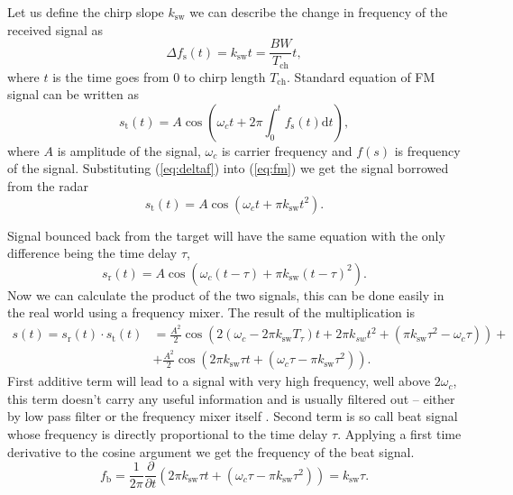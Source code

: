 Let us define the chirp slope $k_\mathrm{sw}$ we can describe the change in frequency of the received signal as
\begin{equation}
  \Delta f_\mathrm{s}(t) = k_\mathrm{sw}t = \frac{BW}{T_\mathrm{ch}} t,
  \label{eq:deltaf}
\end{equation}
where $t$ is the time goes from 0 to chirp length $T_\mathrm{ch}$.
Standard equation of FM signal can be written as
\begin{equation}
  s_\mathrm{t}(t) = A \cos\left(\omega_c t + 2\pi \int_{0}^{t} f_\mathrm{s}(t) \mathrm{d}t\right),
  \label{eq:fm}
\end{equation}
where $A$ is amplitude of the signal, $\omega_c$ is carrier frequency and $f(s)$ is frequency of the signal.
Substituting (\ref{eq:deltaf}) into (\ref{eq:fm}) we get the signal borrowed from the radar
\begin{equation}
  s_\mathrm{t}(t) = A \cos(\omega_c t + \pi k_\mathrm{sw}t^2).
  \label{eq:fm2}
\end{equation}

Signal bounced back from the target will have the same equation with the only difference being the time delay $\tau$,
\begin{equation}
  s_\mathrm{r}(t) = A \cos(\omega_c (t - \tau) + \pi k_\mathrm{sw}(t - \tau)^2).
  \label{eq:fm3}
\end{equation}
Now we can calculate the product of the two signals, this can be done easily in the real world using a frequency mixer.
The result of the multiplication is
\begin{align}
  s(t) = s_\mathrm{r}(t) \cdot  s_\mathrm{t}(t) & = \frac{A^2}{2}\cos\left(2(\omega_c - 2\pi k_\mathrm{sw}T_\tau)t + 2\pi k_{sw}t^2 + (\pi k_\mathrm{sw} \tau^2 - \omega_c \tau) \right)+ \nonumber \\
                                                & +\frac{A^2}{2} \cos\left(2\pi k_\mathrm{sw} \tau t + (\omega_c \tau - \pi k_\mathrm{sw} \tau^2)\right).
  \label{eq:fm4}
\end{align}
First additive term will lead to a signal with very high frequency, well above $2\omega_c$, this term doesn't carry any useful information and is usually filtered out -- either by low pass filter or the frequency mixer itself \cite{graham2005}.
Second term is so call beat signal whose frequency is directly proportional to the time delay $\tau$.
Applying a first time derivative to the cosine argument we get the frequency of the beat signal.
\begin{equation}
  f_\mathrm{b} = \frac{1}{2\pi}\frac{\partial}{\partial t} \left(2\pi k_\mathrm{sw} \tau t + (\omega_c \tau - \pi k_\mathrm{sw} \tau^2)\right) = k_\mathrm{sw} \tau.
  \label{eq:fb}
\end{equation}

